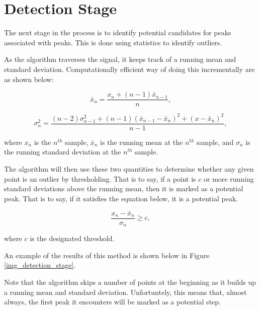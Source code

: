         \section{Detection Stage}

            The next stage in the process is to identify potential candidates for peaks associated with peaks. This is done using statistics to identify outliers. 

            As the algorithm traverses the signal, it keeps track of a running mean and standard deviation. Computationally efficient way of doing this incrementally are as shown below:

            \begin{equation}
                \bar{x}_n = \frac{x_n + (n-1)\bar{x}_{n-1}}{n},
            \end{equation}

            \begin{equation}
                \sigma_n^2 = \frac
                {(n-2)\sigma_{n-1}^2 + (n-1)(\bar{x}_{n-1} -\bar{x}_n)^2 + (x - \bar{x}_n)^2}
                {n-1},
            \end{equation}

            where $x_n$ is the $n^{th}$ sample, $\bar{x}_n$ is the running mean at the $n^{th}$ sample, and $\sigma_n$ is the running standard deviation at the $n^{th}$ sample.

            The algorithm will then use these two quantities to determine whether any given point is an outlier by thresholding. That is to say, if a point is $c$ or more running standard deviations above the running mean, then it is marked as a potential peak. That is to say, if it satisfies the equation below, it is a potential peak.

            \begin{equation}
                \frac{x_n - \bar{x}_n}{\sigma_n}\geq c,
            \end{equation}

            where $c$ is the designated threshold.

            An example of the results of this method is shown below in Figure \ref{img_detection_stage}.

            Note that the algorithm skips a number of points at the beginning as it builds up a running mean and standard deviation. Unfortuntely, this means that, almost always, the first peak it encounters will be marked as a potential step.

